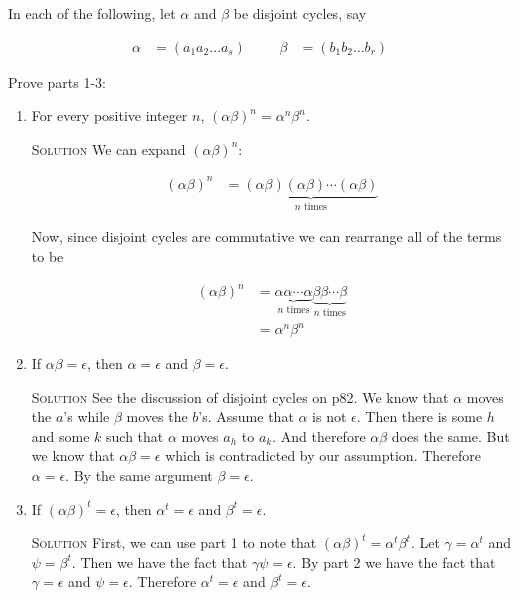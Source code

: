 \documentclass[twoside]{amsart}
\newcommand{\solution}{\textsc{Solution}\xspace}
\newcommand{\eps}{\ensuremath{\epsilon}\xspace}
\begin{document}
\begin{enumerate}[A.]
   \noindent In each of the following, let $\alpha$ and $\beta$ be disjoint
   cycles, say

   \begin{align*}
      \alpha &= (a_1a_2 \dots a_s) & && \beta &= (b_1b_2\dots b_r)
   \end{align*}

   \noindent Prove parts 1-3:

   \begin{enumerate}[1]
      \item For every positive integer $n$, $(\alpha \beta)^n =
      \alpha^n\beta^n$.

      \noindent \solution We can expand $(\alpha \beta)^n$:

      \begin{align*}
         (\alpha \beta)^n &= \underbrace{(\alpha \beta)(\alpha \beta) \cdots
	     (\alpha \beta)}_{n \text{ times}}
      \end{align*}

      Now, since disjoint cycles are commutative we can rearrange all
      of the terms to be

      \begin{align*}
         (\alpha \beta)^n &= \underbrace{\alpha \alpha \cdots 
	    \alpha}_{n \text{ times}} \underbrace{\beta \beta \cdots 
	    \beta}_{n \text{ times}} \\
		          &= \alpha^n \beta ^n
      \end{align*}

      \item If $\alpha \beta = \eps$, then $\alpha = \eps$ and
      $\beta = \eps$.

      \noindent \solution See the discussion of disjoint cycles on p82.
      We know that $\alpha$ moves the $a$'s while $\beta$ moves the $b$'s.
      Assume that $\alpha$ is not $\eps$. Then there is some $h$ and
      some $k$ such that $\alpha$ moves $a_h$ to $a_k$. And therefore
      $\alpha \beta$ does the same. But we know that $\alpha \beta = \eps$
      which is contradicted by our assumption. Therefore $\alpha=\eps$.
      By the same argument $\beta=\eps$.

      \item If $(\alpha \beta)^t = \eps$, then $\alpha^t = \eps$ and
      $\beta^t = \eps$.

      \noindent \solution First, we can use part 1 to note that
      $(\alpha \beta)^t = \alpha^t \beta^t$. Let $\gamma = \alpha^t$ and
      $\psi = \beta^t$. Then we have the fact that $\gamma \psi = \eps$.
      By part 2 we have the fact that $\gamma = \eps$ and $\psi = \eps$.
      Therefore $\alpha^t = \eps$ and $\beta^t = \eps$.


\end{enumerate}
\end{enumerate}
\end{document}
